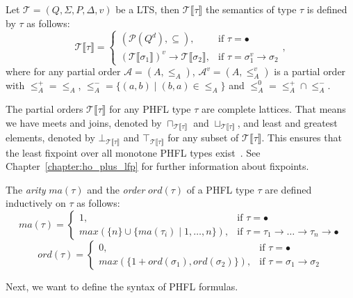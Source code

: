 \begin{definition}
    Let $\mathcal{T} = (Q, \Sigma, P, \Delta, v)$ be a LTS, then $\mathcal{T}\llbracket\tau\rrbracket$ the semantics
    of type $\tau$ is defined by $\tau$ as follows:
        \[\mathcal{T}\llbracket\tau\rrbracket=
        \begin{cases}
            (\mathcal{P}(Q^d), \subseteq),  & \text{if }\tau = \bullet\\
            (\mathcal{T}\llbracket\sigma_1\rrbracket)^v \rightarrow \mathcal{T}\llbracket\sigma_2\rrbracket, &
            \text{if }\tau = \sigma_1^v\rightarrow \sigma_2
        \end{cases},\]
    where for any partial order $\mathcal{A} = (A, \leq_A)$, $\mathcal{A}^v = (A, \leq_A^v)$ is a partial order
    with $\leq_A^+ = \leq_A$, $\leq_A^- = \{(a, b) \mid (b, a) \in \leq_A\}$ and $\leq_A^0 = \leq_A^+ \cap \leq_A^-$.
\end{definition}

The partial orders $\mathcal{T}\llbracket\tau\rrbracket$ for any PHFL type $\tau$ are complete lattices. That means we
have meets and joins, denoted by $\sqcap_{\mathcal{T}\llbracket\tau\rrbracket}$ and
$\sqcup_{\mathcal{T}\llbracket\tau\rrbracket}$, and least and greatest elements, denoted by
$\bot_{\mathcal{T}\llbracket\tau\rrbracket}$ and $\top_{\mathcal{T}\llbracket\tau\rrbracket}$ for any subset of
$\mathcal{T}\llbracket\tau\rrbracket$. This ensures that the least fixpoint over all monotone PHFL types
exist~\cite{tarski1955lattice}. See Chapter~\ref{chapter:ho_plus_lfp} for further information about fixpoints.

\begin{definition}
    The \emph{arity} $ma(\tau)$ and the \emph{order} $ord(\tau)$ of a PHFL type $\tau$ are defined inductively on
    $\tau$ as follows:
\[ma(\tau)=
\begin{cases}
    1, & \text{if }\tau = \bullet\\
    max(\{n\} \cup \{ma(\tau_i)\mid1,\dots,n\}), &
    \text{if }\tau = \tau_1\rightarrow\dots\rightarrow\tau_n\rightarrow\bullet
\end{cases}\]
\[ord(\tau)=
\begin{cases}
    0, & \text{if }\tau = \bullet\\
    max(\{1 + ord(\sigma_1), ord(\sigma_2)\}), & \text{if }\tau = \sigma_1 \rightarrow \sigma_2
\end{cases}\]
\end{definition}

Next, we want to define the syntax of PHFL formulas.

